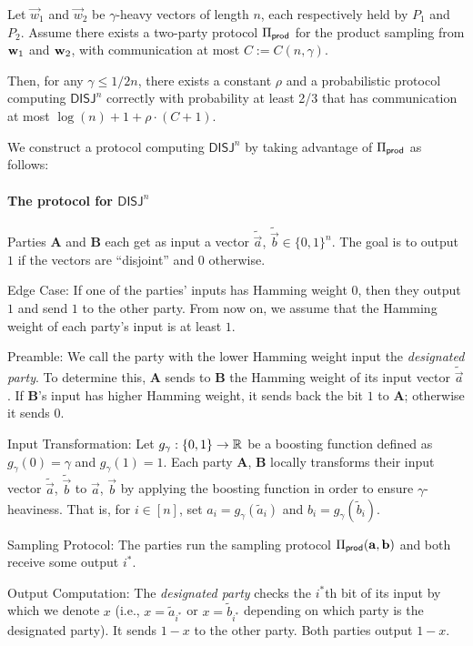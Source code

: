 \begin{theorem} \label{th:lower_bound}
Let $\vec{w}_1$ and $\vec{w}_2$ be 
 $\gamma$-heavy vectors of length $n$, each respectively held by $P_1$
 and $P_2$.   Assume there exists a two-party protocol $\Pi_{\mathsf{prod}}$ for the
 product sampling from $\mathbf{w}_1$ and $\mathbf{w}_2$, with communication at most $C
 := C(n, \gamma)$.  
 
 Then, for any $\gamma \le 1/2n$, there exists a constant $\rho$ and a
 probabilistic protocol computing $\mathsf{DISJ}^n$ correctly with
 probability at least 2/3 that has communication at most $\log(n) + 1 +
 \rho \cdot (C + 1)$.  
 \end{theorem}


We construct a protocol computing $\mathsf{DISJ}^n$ by taking advantage
of $\Pi_{\mathsf{prod}}$ as follows: 

\paragraph{The protocol for $\mathsf{DISJ}^n$}

\noindent
Parties $\mathbf{A}$ and $\mathbf{B}$ each get as input
a vector $\tilde{\vec{a}}$, $\tilde{\vec{b}} \in \{0,1\}^n$.
The goal is to output $1$ if the vectors are ``disjoint''
and $0$ otherwise.

\begin{description}
\item{Edge Case:}
If one of the parties' inputs has Hamming weight $0$, then they output
$1$ and send $1$ to the other party.  From now on, we assume that the
Hamming weight of each party's input is at least $1$.

\item{Preamble:}
We call the party with the lower Hamming weight input the
\emph{designated party}. To determine this, $\mathbf{A}$ sends to
$\mathbf{B}$ the Hamming weight of its input vector $\tilde{\vec{a}}$.
If $\mathbf{B}$'s input has higher Hamming weight, it sends back the bit
$1$ to $\mathbf{A}$; otherwise it sends $0$. 

\item{Input Transformation:}
Let $g_\gamma: \{0,1\} \rightarrow \mathbb{R}$ be a boosting function defined as
$g_\gamma(0) = \gamma$ and $g_\gamma(1) = 1$. 
%
Each party $\mathbf{A}$, $\mathbf{B}$ locally transforms their input
vector $\tilde{\vec{a}}$, $\tilde{\vec{b}}$ to $\vec{a}$, $\vec{b}$ by
applying the boosting function in order to ensure $\gamma$-heaviness.
That is, for $i \in [n]$, set $a_i = g_\gamma(\tilde{a}_i)$ and $b_i =
g_\gamma(\tilde{b}_i)$. 

\item{Sampling Protocol:}
The parties run the sampling protocol $\Pi_{\mathsf{prod}}(\mathbf{a},\mathbf{b})$ and both receive some output
$i^*$.
\item{Output Computation:}
The \emph{designated party} checks the $i^*$th bit of its input by which
we denote $x$ (i.e., $x = \tilde a_{i^*}$ or $x = \tilde b_{i^*}$
depending on which party is the designated party). It sends $1-x$ to the
other party. Both parties output $1-x$. 
\end{description}

